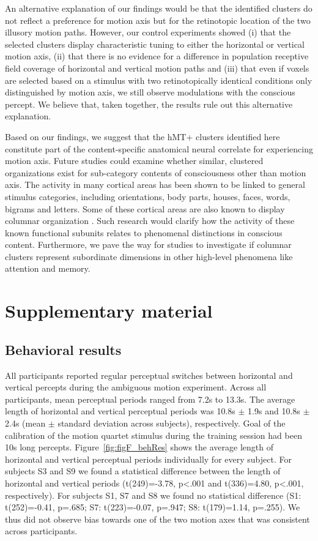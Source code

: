 An alternative explanation of our findings would be that the identified clusters do not reflect a preference for motion axis but for the retinotopic location of the two illusory motion paths. However, our control experiments showed (i) that the selected clusters display characteristic tuning to either the horizontal or vertical motion axis, (ii) that there is no evidence for a difference in population receptive field coverage of horizontal and vertical motion paths and (iii) that even if voxels are selected based on a stimulus with two retinotopically identical conditions only distinguished by motion axis, we still observe modulations with the conscious percept. We believe that, taken together, the results rule out this alternative explanation.

Based on our findings, we suggest that the hMT+ clusters identified here constitute part of the content-specific anatomical neural correlate for experiencing motion axis. Future studies could examine whether similar, clustered organizations exist for sub-category contents of consciousness other than motion axis. The activity in many cortical areas has been shown to be linked to general stimulus categories, including orientations, body parts, houses, faces, words, bigrams and letters. Some of these cortical areas are also known to display columnar organization \parencite{Tanaka2003}. Such research would clarify how the activity of these known functional subunits relates to phenomenal distinctions in conscious content. Furthermore, we pave the way for studies to investigate if columnar clusters represent subordinate dimensions in other high-level phenomena like attention and memory.

\clearpage
\section{Supplementary material}

\subsection{Behavioral results}
All participants reported regular perceptual switches between horizontal and vertical percepts during the ambiguous motion experiment. Across all participants, mean perceptual periods ranged from 7.2s to 13.3s. The average length of horizontal and vertical perceptual periods was 10.8s $\pm$ 1.9s and 10.8s $\pm$ 2.4s (mean $\pm$ standard deviation across subjects), respectively. Goal of the calibration of the motion quartet stimulus during the training session had been 10s long percepts. Figure~\ref{fig:figF_behRes} shows the average length of horizontal and vertical perceptual periods individually for every subject. For subjects S3 and S9 we found a statistical difference between the length of horizontal and vertical periods (t(249)=-3.78, p\textless.001 and t(336)=4.80, p\textless.001, respectively). For subjects S1, S7 and S8 we found no statistical difference (S1: t(252)=-0.41, p=.685; S7: t(223)=-0.07, p=.947; S8: t(179)=1.14, p=.255). We thus did not observe bias towards one of the two motion axes that was consistent across participants.

